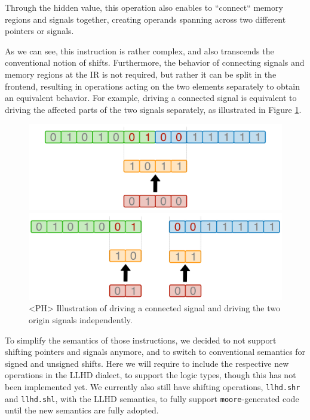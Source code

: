 Through the hidden value, this operation also enables to “connect“ memory regions and signals together, creating operands spanning across two different pointers or signals.

As we can see, this instruction is rather complex, and also transcends the conventional notion of shifts. Furthermore, the behavior of connecting signals and memory regions at the IR is not required, but rather it can be split in the frontend, resulting in operations acting on the two elements separately to obtain an equivalent behavior. For example, driving a connected signal is equivalent to driving the affected parts of the two signals separately, as illustrated in Figure \ref{fig:drvconn}.

\begin{figure}[ht]
    \centering
    \begin{minipage}{0.45\textwidth}
        \includegraphics[width=\textwidth]{gfx/DrvConn.png}
    \end{minipage}
    \hfill
    \begin{minipage}{0.45\textwidth}
        \includegraphics[width=\textwidth]{gfx/DrvSep.png}
    \end{minipage}
    \caption{<PH> Illustration of driving a connected signal and driving the two origin signals independently.}
    \label{fig:drvconn}
\end{figure}

To simplify the semantics of those instructions, we decided to not support shifting pointers and signals anymore, and to switch to conventional semantics for signed and unsigned shifts. Here we will require to include the respective new operations in the LLHD dialect, to support the logic types, though this has not been implemented yet. We currently also still have shifting operations, \texttt{llhd.shr} and \texttt{llhd.shl}, with the LLHD semantics, to fully support \texttt{moore}-generated code until the new semantics are fully adopted.

